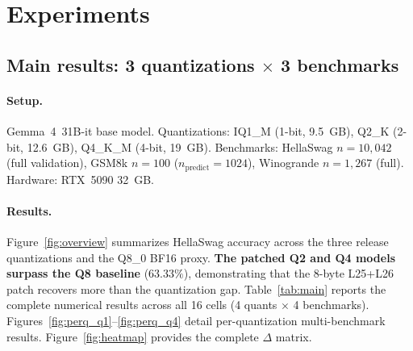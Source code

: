 \documentclass[11pt]{article}
\begin{document}
\section{Experiments}
\label{sec:experiments}

\subsection{Main results: 3 quantizations $\times$ 3 benchmarks}
\label{ssec:main}

\paragraph{Setup.} Gemma~4~31B-it base model. Quantizations: IQ1\_M (1-bit,
9.5~GB), Q2\_K (2-bit, 12.6~GB), Q4\_K\_M (4-bit, 19~GB). Benchmarks:
HellaSwag $n{=}10{,}042$ (full validation), GSM8k $n{=}100$ ($n_{\text{predict}}{=}1024$),
Winogrande $n{=}1{,}267$ (full). Hardware: RTX~5090 32~GB.

\paragraph{Results.} Figure~\ref{fig:overview} summarizes HellaSwag accuracy
across the three release quantizations and the Q8\_0 BF16 proxy.
\textbf{The patched Q2 and Q4 models surpass the Q8 baseline} ($63.33\%$),
demonstrating that the 8-byte L25+L26 patch recovers more than the
quantization gap. Table~\ref{tab:main} reports the complete numerical
results across all 16 cells (4 quants $\times$ 4 benchmarks).
Figures~\ref{fig:perq_q1}--\ref{fig:perq_q4} detail per-quantization
multi-benchmark results. Figure~\ref{fig:heatmap} provides the complete
$\Delta$ matrix.
\end{document}
